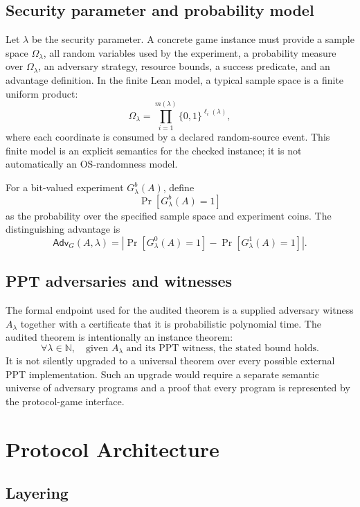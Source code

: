\documentclass[11pt,letterpaper]{article}
\newcommand{\Adv}{\mathsf{Adv}}
\begin{document}
\subsection{Security parameter and probability model}

Let $\lambda$ be the security parameter. A concrete game instance must provide a sample
space $\Omega_\lambda$, all random variables used by the experiment, a probability
measure over $\Omega_\lambda$, an adversary strategy, resource bounds, a success predicate,
and an advantage definition. In the finite Lean model, a typical sample space is a finite
uniform product:
\[
  \Omega_\lambda = \prod_{i=1}^{m(\lambda)} \{0,1\}^{\ell_i(\lambda)},
\]
where each coordinate is consumed by a declared random-source event. This finite model is
an explicit semantics for the checked instance; it is not automatically an OS-randomness
model.

For a bit-valued experiment $G^b_\lambda(A)$, define
\[
  \Pr[G^b_\lambda(A)=1]
\]
as the probability over the specified sample space and experiment coins. The distinguishing
advantage is
\[
  \Adv_G(A,\lambda) = \left|
    \Pr[G^0_\lambda(A)=1] - \Pr[G^1_\lambda(A)=1]
  \right|.
\]

\subsection{PPT adversaries and witnesses}

The formal endpoint used for the audited theorem is a supplied adversary witness
$A_\lambda$ together with a certificate that it is probabilistic polynomial time. The
audited theorem is intentionally an instance theorem:
\[
  \forall \lambda \in \mathbb{N},\quad
  \text{given } A_\lambda \text{ and its PPT witness, the stated bound holds.}
\]
It is not silently upgraded to a universal theorem over every possible external PPT
implementation. Such an upgrade would require a separate semantic universe of adversary
programs and a proof that every program is represented by the protocol-game interface.

\section{Protocol Architecture}
\label{sec:architecture}

\subsection{Layering}
\end{document}
